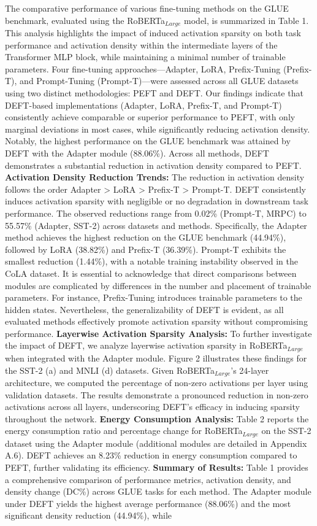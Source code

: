 \documentclass[11pt,a4paper]{article}
\begin{document}
The comparative performance of various fine-tuning methods on the GLUE benchmark, evaluated using the RoBERTa\(_{Large}\) model, is summarized in Table 1. This analysis highlights the impact of induced activation sparsity on both task performance and activation density within the intermediate layers of the Transformer MLP block, while maintaining a minimal number of trainable parameters. Four fine-tuning approaches—Adapter, LoRA, Prefix-Tuning (Prefix-T), and Prompt-Tuning (Prompt-T)—were assessed across all GLUE datasets using two distinct methodologies: PEFT and DEFT. Our findings indicate that DEFT-based implementations (Adapter, LoRA, Prefix-T, and Prompt-T) consistently achieve comparable or superior performance to PEFT, with only marginal deviations in most cases, while significantly reducing activation density. Notably, the highest performance on the GLUE benchmark was attained by DEFT with the Adapter module (88.06\%). Across all methods, DEFT demonstrates a substantial reduction in activation density compared to PEFT. \textbf{Activation Density Reduction Trends:} The reduction in activation density follows the order Adapter \textgreater{} LoRA \textgreater{} Prefix-T \textgreater{} Prompt-T. DEFT consistently induces activation sparsity with negligible or no degradation in downstream task performance. The observed reductions range from 0.02\% (Prompt-T, MRPC) to 55.57\% (Adapter, SST-2) across datasets and methods. Specifically, the Adapter method achieves the highest reduction on the GLUE benchmark (44.94\%), followed by LoRA (38.82\%) and Prefix-T (36.39\%). Prompt-T exhibits the smallest reduction (1.44\%), with a notable training instability observed in the CoLA dataset. It is essential to acknowledge that direct comparisons between modules are complicated by differences in the number and placement of trainable parameters. For instance, Prefix-Tuning introduces trainable parameters to the hidden states. Nevertheless, the generalizability of DEFT is evident, as all evaluated methods effectively promote activation sparsity without compromising performance. \textbf{Layerwise Activation Sparsity Analysis:} To further investigate the impact of DEFT, we analyze layerwise activation sparsity in RoBERTa\(_{Large}\) when integrated with the Adapter module. Figure 2 illustrates these findings for the SST-2 (a) and MNLI (d) datasets. Given RoBERTa\(_{Large}\)'s 24-layer architecture, we computed the percentage of non-zero activations per layer using validation datasets. The results demonstrate a pronounced reduction in non-zero activations across all layers, underscoring DEFT's efficacy in inducing sparsity throughout the network. \textbf{Energy Consumption Analysis:} Table 2 reports the energy consumption ratio and percentage change for RoBERTa\(_{Large}\) on the SST-2 dataset using the Adapter module (additional modules are detailed in Appendix A.6). DEFT achieves an 8.23\% reduction in energy consumption compared to PEFT, further validating its efficiency. \textbf{Summary of Results:} Table 1 provides a comprehensive comparison of performance metrics, activation density, and density change (DC\%) across GLUE tasks for each method. The Adapter module under DEFT yields the highest average performance (88.06\%) and the most significant density reduction (44.94\%), while 
\end{document}
